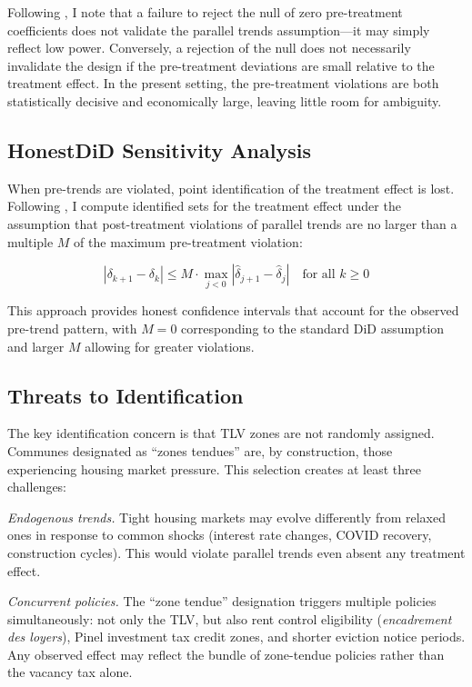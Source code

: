 \documentclass[12pt]{article}
\begin{document}
Following \citet{roth2023pretest}, I note that a failure to reject the null of zero pre-treatment coefficients does not validate the parallel trends assumption---it may simply reflect low power. Conversely, a rejection of the null does not necessarily invalidate the design if the pre-treatment deviations are small relative to the treatment effect. In the present setting, the pre-treatment violations are both statistically decisive and economically large, leaving little room for ambiguity.

\subsection{HonestDiD Sensitivity Analysis}

When pre-trends are violated, point identification of the treatment effect is lost. Following \citet{rambachan2023more}, I compute identified sets for the treatment effect under the assumption that post-treatment violations of parallel trends are no larger than a multiple $M$ of the maximum pre-treatment violation:

\begin{equation}
|\delta_{k+1} - \delta_k| \leq M \cdot \max_{j < 0} |\hat{\delta}_{j+1} - \hat{\delta}_j| \quad \text{for all } k \geq 0
\end{equation}

This approach provides honest confidence intervals that account for the observed pre-trend pattern, with $M = 0$ corresponding to the standard DiD assumption and larger $M$ allowing for greater violations.

\subsection{Threats to Identification}

The key identification concern is that TLV zones are not randomly assigned. Communes designated as ``zones tendues'' are, by construction, those experiencing housing market pressure. This selection creates at least three challenges:

\textit{Endogenous trends.} Tight housing markets may evolve differently from relaxed ones in response to common shocks (interest rate changes, COVID recovery, construction cycles). This would violate parallel trends even absent any treatment effect.

\textit{Concurrent policies.} The ``zone tendue'' designation triggers multiple policies simultaneously: not only the TLV, but also rent control eligibility (\textit{encadrement des loyers}), Pinel investment tax credit zones, and shorter eviction notice periods. Any observed effect may reflect the bundle of zone-tendue policies rather than the vacancy tax alone.
\end{document}

